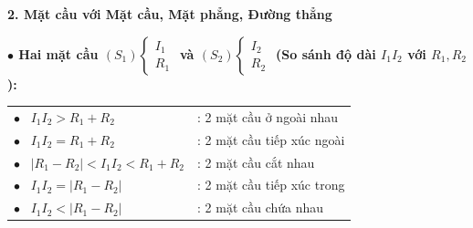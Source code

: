 \documentclass[12pt,a4paper]{article}
\begin{document}
\begin{theorybox}
    \textbf{\textcolor{deepblue}{\large 2. Mặt cầu với Mặt cầu, Mặt phẳng, Đường thẳng}}
    \par\vspace{6pt}

    \textbf{\textcolor{amberorange}{$\bullet$ Hai mặt cầu $(S_1)\begin{cases} I_1 \\ R_1 \end{cases}$ và $(S_2)\begin{cases} I_2 \\ R_2 \end{cases}$ (So sánh độ dài $I_1I_2$ với $R_1, R_2$):}}
    \renewcommand{\arraystretch}{1.4}
    \begin{center}
    \begin{tabular}{l l}
        $\bullet$ \ $I_1I_2 > R_1 + R_2$ & : 2 mặt cầu ở ngoài nhau \\
        $\bullet$ \ $I_1I_2 = R_1 + R_2$ & : 2 mặt cầu tiếp xúc ngoài \\
        $\bullet$ \ $|R_1 - R_2| < I_1I_2 < R_1 + R_2$ & : 2 mặt cầu cắt nhau \\
        $\bullet$ \ $I_1I_2 = |R_1 - R_2|$ & : 2 mặt cầu tiếp xúc trong \\
        $\bullet$ \ $I_1I_2 < |R_1 - R_2|$ & : 2 mặt cầu chứa nhau \\
    \end{tabular}
    \end{center}

    \vspace{0.25cm}
    \begin{center}
\end{center}
\end{theorybox}
\end{document}
